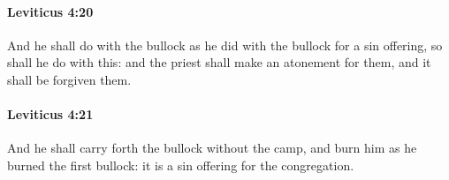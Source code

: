 		\paragraph{Leviticus 4:20} %
			\label{LEVITICUS-4-20}

			And he shall do with the bullock as he did with the bullock for a sin offering, so shall he do with this: and the priest shall make an atonement for them, and it shall be forgiven them.


		\paragraph{Leviticus 4:21} %
			\label{LEVITICUS-4-21}

			And he shall carry forth the bullock without the camp, and burn him as he burned the first bullock: it is a sin offering for the congregation.


